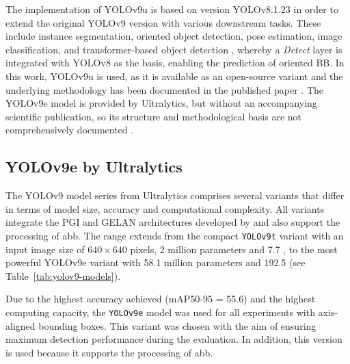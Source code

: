 The implementation of \acrshort{YOLO}v9u is based on version \acrshort{YOLO}v8.1.23 \cite{yolo_v9u_github} in order to extend the original \acrshort{YOLO}v9 version with various downstream tasks. These include instance segmentation, oriented object detection, pose estimation, image classification, and transformer-based object detection \cite{wang2024}, whereby a \textit{Detect} layer is integrated with \acrshort{YOLO}v8 as the basis, enabling the prediction of oriented \acrshort{BB}. In this work, \acrshort{YOLO}v9u is used, as it is available as an open-source variant and the underlying methodology has been documented in the published paper \cite{wang2024_sapkota}. The \acrshort{YOLO}v9e model is provided by Ultralytics, but without an accompanying scientific publication, so its structure and methodological basis are not comprehensively documented \cite{ultralyics_2023}.
 



\subsection{YOLOv9e by Ultralytics}
\label{subsec:yolov9e}

The \acrshort{YOLO}v9 model series from Ultralytics comprises several variants that differ in terms of model size, accuracy and computational complexity. All variants integrate the \acrshort{PGI} and \acrshort{GELAN} architectures developed by \citeauthor{wang2024_sapkota} and also support the processing of \acrshort{abb}. The range extends from the compact \texttt{YOLOv9t} variant with an input image size of $640 \times 640$ pixels, 2 million parameters and 7.7 , to the most powerful \acrshort{YOLO}v9e variant with 58.1 million parameters and 192.5  (see Table~\ref{tab:yolov9-models}).

Due to the highest accuracy achieved (\acrshort{mAP}50-95 = 55.6) and the highest computing capacity, the \texttt{YOLOv9e} model was used for all experiments with axis-aligned bounding boxes. This variant was chosen with the aim of ensuring maximum detection performance during the evaluation. In addition, this version is used because it supports the processing of \acrlong{abb}.




